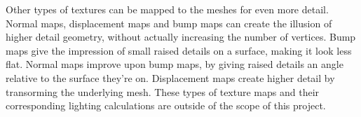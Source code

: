 Other types of textures can be mapped to the meshes for even more detail.
Normal maps,
displacement maps and bump maps can create the illusion of higher detail geometry,
without actually increasing the number of vertices.
Bump maps give the impression of small raised details on a surface,
making it look less flat.
Normal maps improve upon bump maps,
by giving raised details an angle relative to the surface they're on.
Displacement maps create higher detail by transorming the underlying mesh.
These types of texture maps and their corresponding lighting calculations are outside of the scope of this project.
